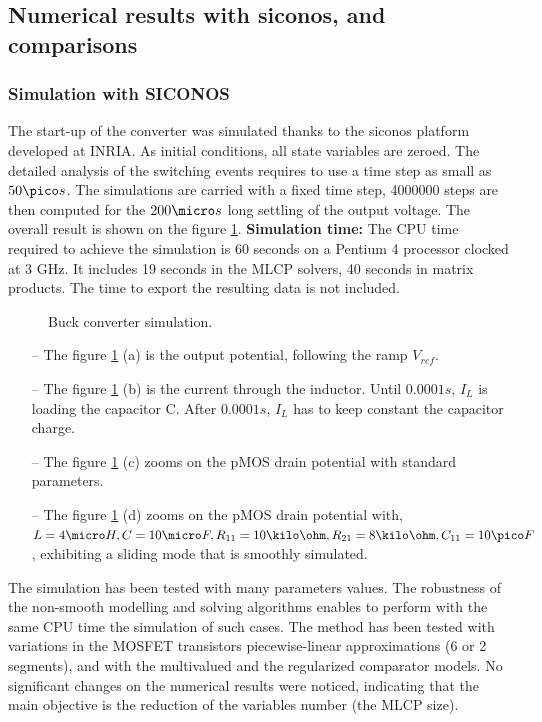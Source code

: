 \subsection{Numerical results with {\sc siconos},  and comparisons}
\label{section42}
\subsubsection{Simulation with SICONOS}
 The start-up of the converter was simulated thanks to the {\sc siconos} platform
developed at INRIA. As initial conditions, all state variables are zeroed.
The detailed analysis of the switching events requires to use a time step as
small as $50 \pico s$. The simulations are carried with a fixed time step, 4000000 steps
are then computed for the $200 \micro s$ long settling of the output voltage.
The overall result is shown on the figure \ref{fig:figSimuBuck}.  
\vskip 0.2cm
{\bf Simulation time:} The CPU time required to achieve the simulation is 60 seconds on a
Pentium 4 processor clocked at 3 GHz. It includes 19 seconds in the MLCP solvers, 40 seconds in
matrix products. The time to export the resulting data is not included.
\begin{figure}[h]
  \centering
   \scalebox{0.6}{
  
  }
  \caption{Buck converter simulation.}
  \label{fig:figSimuBuck}
\end{figure}

\begin{enumerate}
  \item[--] The figure \ref{fig:figSimuBuck} (a) is the output potential, following the ramp $V_{ref}$.
    \item[--] The figure \ref{fig:figSimuBuck} (b) is the current through the inductor. Until $0.0001s$, $I_L$
    is loading the capacitor C. After $0.0001s$, $I_L$ has to keep constant the capacitor charge.
    \item[--] The figure \ref{fig:figSimuBuck} (c) zooms on the pMOS drain potential with standard
    parameters.
    \item[--] The figure  \ref{fig:figSimuBuck} (d) zooms on the pMOS drain potential with, $L=4\micro H,
    C=10\micro F,
    R_{11}=10\kilo \ohm, R_{21}=8\kilo \ohm ,C_{11}=10\pico F$, exhibiting a
    sliding mode that is smoothly simulated. 
  \end{enumerate}

The simulation has been tested with many parameters values. The robustness of the non-smooth modelling and solving algorithms enables to perform with the same CPU time the simulation of such cases. The method has been tested with variations in the MOSFET transistors piecewise-linear approximations (6 or 2 segments), and with the multivalued and the regularized comparator models. No significant changes on the numerical results were noticed, indicating that the main objective is the reduction of the variables number (the MLCP size).  



